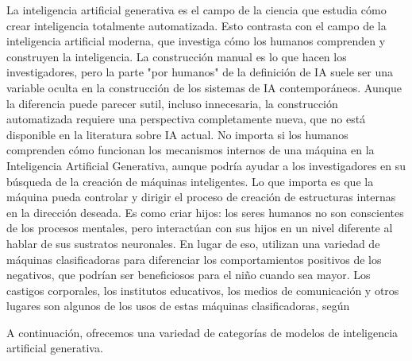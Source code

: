 La inteligencia artificial generativa es el campo de la ciencia que estudia cómo crear inteligencia totalmente automatizada. Esto contrasta con el campo de la inteligencia artificial moderna, que investiga cómo los humanos comprenden y construyen la inteligencia. La construcción manual es lo que hacen los investigadores, pero la parte "por humanos" de la definición de IA suele ser una variable oculta en la construcción de los sistemas de IA contemporáneos. Aunque la diferencia puede parecer sutil, incluso innecesaria, la construcción automatizada requiere una perspectiva completamente nueva, que no está disponible en la literatura sobre IA actual. No importa si los humanos comprenden cómo funcionan los mecanismos internos de una máquina en la Inteligencia Artificial Generativa, aunque podría ayudar a los investigadores en su búsqueda de la creación de máquinas inteligentes. Lo que importa es que la máquina pueda controlar y dirigir el proceso de creación de estructuras internas en la dirección deseada. Es como criar hijos: los seres humanos no son conscientes de los procesos mentales, pero interactúan con sus hijos en un nivel diferente al hablar de sus sustratos neuronales. En lugar de eso, utilizan una variedad de máquinas clasificadoras para diferenciar los comportamientos positivos de los negativos, que podrían ser beneficiosos para el niño cuando sea mayor. Los castigos corporales, los institutos educativos, los medios de comunicación y otros lugares son algunos de los usos de estas máquinas clasificadoras, según \parencite{th_zant2010genai}

A continuación, ofrecemos una variedad de categorías de modelos de inteligencia artificial generativa.


